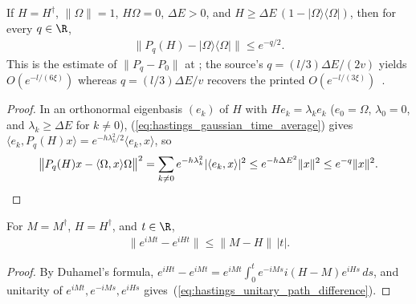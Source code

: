 \begin{lemma}
    \label{thm:hastings_gaussian_time_average_gap}
    \leanok
    If $H=H^\dagger$, $\|\Omega\|=1$, $H\Omega=0$, $\Delta E>0$, and
    $H\ge\Delta E\,(1-|\Omega\rangle\langle\Omega|)$, then for every $q\in\R$,
    \begin{align}
        \bigl\|P_q(H)-|\Omega\rangle\langle\Omega|\bigr\|\le e^{-q/2}.
        \label{eq:hastings_gaussian_time_average_gap}
    \end{align}
    This is the estimate of $\|P_q-P_0\|$ at
    \cite[line 848]{Hastings2007AreaLaw}; the source's $q=(l/3)\Delta E/(2v)$
    yields $O(e^{-l/(6\xi)})$ whereas $q=(l/3)\Delta E/v$ recovers the printed
    $O(e^{-l/(3\xi)})$~\cite{gap:hastings07_gaussian_average_exponent}.
\end{lemma}
\begin{proof}\leanok
    In an orthonormal eigenbasis $(e_k)$ of $H$ with $He_k=\lambda_ke_k$
    ($e_0=\Omega$, $\lambda_0=0$, and $\lambda_k\ge\Delta E$ for $k\ne0$),
    (\ref{eq:hastings_gaussian_time_average}) gives
    $\langle e_k,P_q(H)x\rangle=e^{-h\lambda_k^2/2}\langle e_k,x\rangle$, so
    \begin{align}
        \bigl\|P_q(H)x-\langle\Omega,x\rangle\Omega\bigr\|^2
        =\sum_{k\ne0}e^{-h\lambda_k^2}|\langle e_k,x\rangle|^2
        \le e^{-h\Delta E^2}\|x\|^2\le e^{-q}\|x\|^2.
        \notag
    \end{align}
\end{proof}

\begin{lemma}
    \label{thm:hastings_unitary_path_difference}
    \leanok
    For $M=M^\dagger$, $H=H^\dagger$, and $t\in\R$,
    \begin{align}
        \|e^{iMt}-e^{iHt}\|\le\|M-H\|\,|t|.
        \label{eq:hastings_unitary_path_difference}
    \end{align}
\end{lemma}
\begin{proof}\leanok
    By Duhamel's formula,
    $e^{iHt}-e^{iMt}=e^{iMt}\int_0^te^{-iMs}i(H-M)e^{iHs}\,ds$, and unitarity
    of $e^{iMt},e^{-iMs},e^{iHs}$ gives~(\ref{eq:hastings_unitary_path_difference}).
\end{proof}

